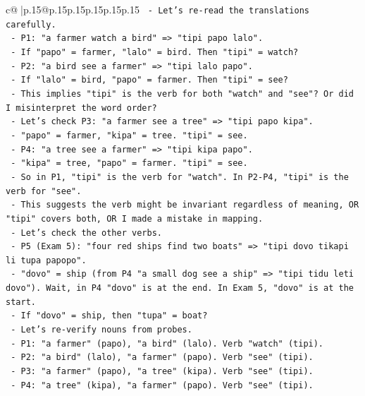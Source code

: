 \documentclass{article}
\begin{document}
{\begin{supertabular}{c@{$\;$}|p{.15\linewidth}@{}p{.15\linewidth}p{.15\linewidth}p{.15\linewidth}p{.15\linewidth}p{.15\linewidth}}
{{{\texttt{    {-} Let's re{-}read the translations carefully.} \\
\texttt{    {-} P1: "a farmer watch a bird" => "tipi papo lalo".} \\
\texttt{      {-} If "papo" = farmer, "lalo" = bird. Then "tipi" = watch?} \\
\texttt{    {-} P2: "a bird see a farmer" => "tipi lalo papo".} \\
\texttt{      {-} If "lalo" = bird, "papo" = farmer. Then "tipi" = see?} \\
\texttt{    {-} This implies "tipi" is the verb for both "watch" and "see"? Or did I misinterpret the word order?} \\
\texttt{    {-} Let's check P3: "a farmer see a tree" => "tipi papo kipa".} \\
\texttt{      {-} "papo" = farmer, "kipa" = tree. "tipi" = see.} \\
\texttt{    {-} P4: "a tree see a farmer" => "tipi kipa papo".} \\
\texttt{      {-} "kipa" = tree, "papo" = farmer. "tipi" = see.} \\
\texttt{    {-} So in P1, "tipi" is the verb for "watch". In P2{-}P4, "tipi" is the verb for "see".} \\
\texttt{    {-} This suggests the verb might be invariant regardless of meaning, OR "tipi" covers both, OR I made a mistake in mapping.} \\
\texttt{    {-} Let's check the other verbs.} \\
\texttt{    {-} P5 (Exam 5): "four red ships find two boats" => "tipi dovo tikapi li tupa papopo".} \\
\texttt{      {-} "dovo" = ship (from P4 "a small dog see a ship" => "tipi tidu leti dovo"). Wait, in P4 "dovo" is at the end. In Exam 5, "dovo" is at the start.} \\
\texttt{      {-} If "dovo" = ship, then "tupa" = boat?} \\
\texttt{      {-} Let's re{-}verify nouns from probes.} \\
\texttt{      {-} P1: "a farmer" (papo), "a bird" (lalo). Verb "watch" (tipi).} \\
\texttt{      {-} P2: "a bird" (lalo), "a farmer" (papo). Verb "see" (tipi).} \\
\texttt{      {-} P3: "a farmer" (papo), "a tree" (kipa). Verb "see" (tipi).} \\
\texttt{      {-} P4: "a tree" (kipa), "a farmer" (papo). Verb "see" (tipi).} \\
}}}
\end{supertabular}}
\end{document}
